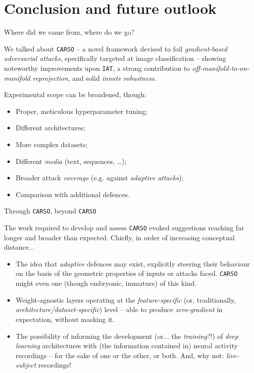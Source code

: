 
\section{ Conclusion and future outlook}{

    \begin{frame}{ Where did we came from, where do we go?}

        We talked about \texttt{CARSO} -- a novel framework devised to foil \textit{gradient-based adversarial attacks}, specifically targeted at image classification -- showing noteworthy improvements upon \texttt{IAT}, a strong contribution to \textit{off-manifold-to-on-manifold reprojection}, and solid \textit{innate robustness}.

        Experimental scope can be broadened, though:
        \begin{itemize}
            \item Proper, meticulous hyperparameter tuning;
            \item Different architectures;
            \item More complex datasets;
            \item Different \textit{media} (text, sequences, \etc\dots);
            \item Broader attack \textit{coverage} (e.g. against \textit{adaptive attacks});
            \item Comparison with additional defences.
        \end{itemize}

    \end{frame}

    \begin{frame}{ Through \texttt{CARSO}, beyond \texttt{CARSO}}

        The work required to develop and assess \texttt{CARSO} evoked suggestions reaching far longer and broader than expected. Chiefly, in order of increasing conceptual distance...

        \begin{itemize}
            \item The idea that \textit{adaptive} defences may exist, explicitly steering their behaviour on the basis of the geometric properties of inputs or attacks faced. \texttt{CARSO} might even one (though embryonic, immature) of this kind.
            \item Weight-agnostic layers operating at the \textit{feature-specific} (or, traditionally, \textit{architecture/dataset-specific}) level -- able to produce \textit{zero-gradient} in expectation, without masking it.
            \item The possibility of informing the development (or... the \textit{training}?!) of \textit{deep learning} architectures with (the information contained in) neural activity recordings -- for the sake of one or the other, or both. And, why not: \textit{live-subject} recordings! 
        \end{itemize}
    \end{frame}

}

